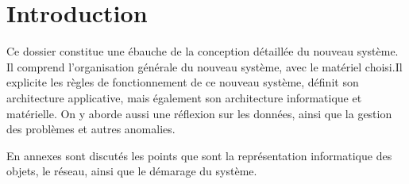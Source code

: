 \section*{Introduction}

Ce dossier constitue une ébauche de la conception
détaillée du nouveau système. Il comprend l'organisation
générale du nouveau système, avec le matériel choisi.Il
explicite les règles de fonctionnement de ce nouveau système,
définit son architecture applicative, mais également son 
architecture informatique et matérielle. On y aborde aussi
une réflexion sur les données, ainsi que la gestion des problèmes
et autres anomalies.

En annexes sont discutés les points que sont la représentation
informatique des objets, le réseau, ainsi que le démarage du système.


